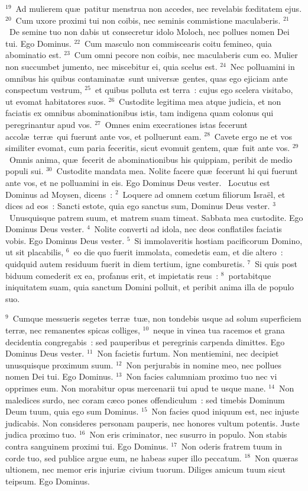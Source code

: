 ${}^{19}$~Ad mulierem qu\ae\ patitur menstrua non accedes, nec revelabis fœditatem ejus.
${}^{20}$~Cum uxore proximi tui non coibis, nec seminis commistione maculaberis.
${}^{21}$~De semine tuo non dabis ut consecretur idolo Moloch, nec pollues nomen Dei tui. Ego Dominus.
${}^{22}$~Cum masculo non commiscearis coitu femineo, quia abominatio est.
${}^{23}$~Cum omni pecore non coibis, nec maculaberis cum eo. Mulier non succumbet jumento, nec miscebitur ei, quia scelus est.
${}^{24}$~Nec polluamini in omnibus his quibus contaminat\ae\ sunt univers\ae\ gentes, quas ego ejiciam ante conspectum vestrum,
${}^{25}$~et quibus polluta est terra~: cujus ego scelera visitabo, ut evomat habitatores suos.
${}^{26}$~Custodite legitima mea atque judicia, et non faciatis ex omnibus abominationibus istis, tam indigena quam colonus qui peregrinantur apud vos.
${}^{27}$~Omnes enim execrationes istas fecerunt accol\ae\ terr\ae\ qui fuerunt ante vos, et polluerunt eam.
${}^{28}$~Cavete ergo ne et vos similiter evomat, cum paria feceritis, sicut evomuit gentem, qu\ae\ fuit ante vos.
${}^{29}$~Omnis anima, qu\ae\ fecerit de abominationibus his quippiam, peribit de medio populi sui.
${}^{30}$~Custodite mandata mea. Nolite facere qu\ae\ fecerunt hi qui fuerunt ante vos, et ne polluamini in eis. Ego Dominus Deus vester.
~Locutus est Dominus ad Moysen, dicens~:
${}^{2}$~Loquere ad omnem cœtum filiorum Isra\"el, et dices ad eos~: Sancti estote, quia ego sanctus sum, Dominus Deus vester.
${}^{3}$~Unusquisque patrem suum, et matrem suam timeat. Sabbata mea custodite. Ego Dominus Deus vester.
${}^{4}$~Nolite converti ad idola, nec deos conflatiles faciatis vobis. Ego Dominus Deus vester.
${}^{5}$~Si immolaveritis hostiam pacificorum Domino, ut sit placabilis,
${}^{6}$~eo die quo fuerit immolata, comedetis eam, et die altero~: quidquid autem residuum fuerit in diem tertium, igne comburetis.
${}^{7}$~Si quis post biduum comederit ex ea, profanus erit, et impietatis reus~:
${}^{8}$~portabitque iniquitatem suam, quia sanctum Domini polluit, et peribit anima illa de populo suo.


${}^{9}$~Cumque messueris segetes terr\ae\ tu\ae , non tondebis usque ad solum superficiem terr\ae , nec remanentes spicas colliges,
${}^{10}$~neque in vinea tua racemos et grana decidentia congregabis~: sed pauperibus et peregrinis carpenda dimittes. Ego Dominus Deus vester.
${}^{11}$~Non facietis furtum. Non mentiemini, nec decipiet unusquisque proximum suum.
${}^{12}$~Non perjurabis in nomine meo, nec pollues nomen Dei tui. Ego Dominus.
${}^{13}$~Non facies calumniam proximo tuo nec vi opprimes eum. Non morabitur opus mercenarii tui apud te usque mane.
${}^{14}$~Non maledices surdo, nec coram c\ae co pones offendiculum~: sed timebis Dominum Deum tuum, quia ego sum Dominus.
${}^{15}$~Non facies quod iniquum est, nec injuste judicabis. Non consideres personam pauperis, nec honores vultum potentis. Juste judica proximo tuo.
${}^{16}$~Non eris criminator, nec susurro in populo. Non stabis contra sanguinem proximi tui. Ego Dominus.
${}^{17}$~Non oderis fratrem tuum in corde tuo, sed publice argue eum, ne habeas super illo peccatum.
${}^{18}$~Non qu\ae ras ultionem, nec memor eris injuri\ae\ civium tuorum. Diliges amicum tuum sicut teipsum. Ego Dominus.


